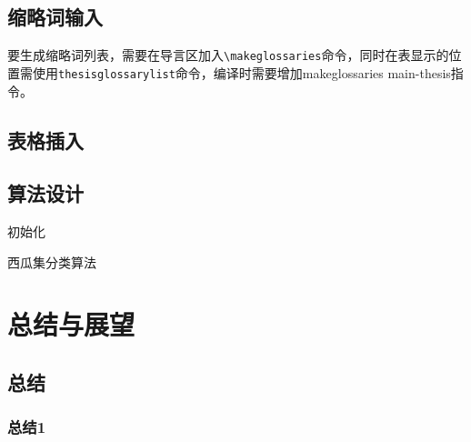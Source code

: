 \documentclass[master]{styles/hdu-thesis}
\begin{document}
\section{缩略词输入}

要生成缩略词列表，需要在导言区加入\verb+\makeglossaries+命令，同时在表显示的位置需使用\verb+thesisglossarylist+命令，编译时需要增加makeglossaries main-thesis指令。



\section{表格插入}

\begin{table}[h]
  \caption{工作进度安排}
\centering
{}
\label{gra_process}
\end{table}

\section{算法设计}

\begin{algorithm}[H]
    初始化\;
    \caption{西瓜集分类算法}
\end{algorithm}


\chapter{总结与展望}

\section{总结}
\subsection{总结1}
\end{document}
